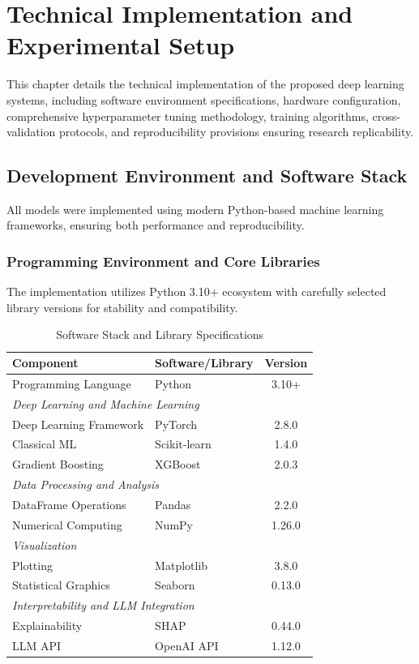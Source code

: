 \chapter{Technical Implementation and Experimental Setup}

This chapter details the technical implementation of the proposed deep learning systems, including software environment specifications, hardware configuration, comprehensive hyperparameter tuning methodology, training algorithms, cross-validation protocols, and reproducibility provisions ensuring research replicability.

\section{Development Environment and Software Stack}

All models were implemented using modern Python-based machine learning frameworks, ensuring both performance and reproducibility.

\subsection{Programming Environment and Core Libraries}

The implementation utilizes Python 3.10+ ecosystem with carefully selected library versions for stability and compatibility.

\begin{table}[h]
\centering
\caption{Software Stack and Library Specifications}
\label{tab:software}
\begin{tabular}{llc}
\toprule
\textbf{Component} & \textbf{Software/Library} & \textbf{Version} \\
\midrule
Programming Language & Python & 3.10+ \\
\midrule
\multicolumn{3}{l}{\textit{Deep Learning and Machine Learning}} \\
Deep Learning Framework & PyTorch & 2.8.0 \\
Classical ML & Scikit-learn & 1.4.0 \\
Gradient Boosting & XGBoost & 2.0.3 \\
\midrule
\multicolumn{3}{l}{\textit{Data Processing and Analysis}} \\
DataFrame Operations & Pandas & 2.2.0 \\
Numerical Computing & NumPy & 1.26.0 \\
\midrule
\multicolumn{3}{l}{\textit{Visualization}} \\
Plotting & Matplotlib & 3.8.0 \\
Statistical Graphics & Seaborn & 0.13.0 \\
\midrule
\multicolumn{3}{l}{\textit{Interpretability and LLM Integration}} \\
Explainability & SHAP & 0.44.0 \\
LLM API & OpenAI API & 1.12.0 \\
\bottomrule
\end{tabular}
\end{table}

